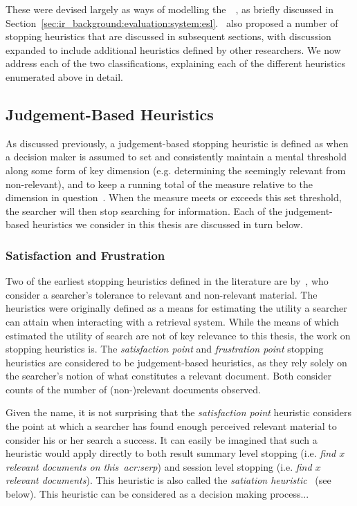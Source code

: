 These were devised largely as ways of modelling the~~\citep{cooper1968expected_search_length}, as briefly discussed in Section~\ref{sec:ir_background:evaluation:system:esl}.~\cite{nickles1995judgment} also proposed a number of stopping heuristics that are discussed in subsequent sections, with discussion expanded to include additional heuristics defined by other researchers. We now address each of the two classifications, explaining each of the different heuristics enumerated above in detail.

\subsection{Judgement-Based Heuristics}\label{sec:stopping_background:heuristics:judgement}
As discussed previously, a judgement-based stopping heuristic is defined as when a decision maker is assumed to set and consistently maintain a mental threshold along some form of key dimension (e.g. determining the seemingly relevant from non-relevant), and to keep a running total of the measure relative to the dimension in question~\citep{gettys1979hypothesis, nickles1995judgment}. When the measure meets or exceeds this set threshold, the searcher will then stop searching for information. Each of the judgement-based heuristics we consider in this thesis are discussed in turn below.

\subsubsection{Satisfaction and Frustration}\label{sec:stopping_background:heuristics:frustration}
Two of the earliest stopping heuristics defined in the literature are by~\cite{cooper1973retrieval_effectiveness_ii}, who consider a searcher's tolerance to relevant and non-relevant material. The heuristics were originally defined as a means for estimating the utility a searcher can attain when interacting with a retrieval system. While the means of which~\cite{cooper1973retrieval_effectiveness_ii} estimated the utility of search are not of key relevance to this thesis, the work on stopping heuristics is. The \emph{satisfaction point} and \emph{frustration point} stopping heuristics are considered to be judgement-based heuristics, as they rely solely on the searcher's notion of what constitutes a relevant document. Both consider counts of the number of (non-)relevant documents observed.

Given the name, it is not surprising that the \emph{satisfaction point} heuristic considers the point at which a searcher has found enough perceived relevant material to consider his or her search a success. It can easily be imagined that such a heuristic would apply directly to both result summary level stopping (i.e. \emph{find $x$ relevant documents on this~\gls{acr:serp}}) and session level stopping (i.e. \emph{find $x$ relevant documents}). This heuristic is also called the \emph{satiation heuristic}~\citep{simon1955satiation} (see below). This heuristic can be considered as a decision making process...

